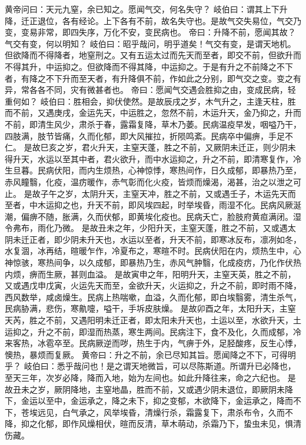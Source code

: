 \documentclass[a4paper,12pt,UTF8,twoside]{ctexbook}
\begin{document}
黄帝问曰：天元九窒，余已知之。愿闻气交，何名失守？
岐伯曰：谓其上下升降，迁正退位，各有经论。上下各有不前，故名失守也。是故气交失易位，气交乃变，变易非常，即四失序，万化不安，变民病也。
帝曰：升降不前，愿闻其故？气交有变，何以明知？
岐伯曰：昭乎哉问，明乎道矣！气交有变，是谓天地机。但欲降而不得降者，地窒刑之。又有五运太过而先天而至者，即交不前，但欲升而不得其升，中运抑之。但欲降而不得其降，中运抑之。于是有升之不前降之不下者，有降之不下升而至天者，有升降俱不前，作如此之分别，即气交之变。变之有异，常各各不同，灾有微甚者也。
帝曰：愿闻气交遇会胜抑之由，变成民病，轻重何如？
岐伯曰：胜相会，抑伏使然。是故辰戌之岁，木气升之，主逢天柱，胜而不前，又遇庚戌，金运先天，中运胜之，忽然不前，木运升天，金乃抑之，升而不前，即清生风少，肃杀于春，露霜复降，草木乃萎。民病温疫早发，咽嗌乃干，四肢满，肢节皆痛，久而化郁，即大风摧拉，折陨鸣紊。民病卒中偏痹，手足不仁。
是故巳亥之岁，君火升天，主窒天蓬，胜之不前，又厥阴未迁正，则少阴未得升天，水运以至其中者，君火欲升，而中水运抑之，升之不前，即清寒复作，冷生旦暮。民病伏阳，而内生烦热，心神惊悸，寒热间作，日久成郁，即暴热乃至，赤风瞳翳，化疫，温疠暖作，赤气彰而化火疫，皆烦而燥渴，渴甚，治之以泄之可止。
是故子午之岁，太阴升天，主窒天冲，胜之不前，又或遇壬子，木运先天而至者，中木运抑之也，升天不前，即风埃四起，时举埃昏，雨湿不化。民病风厥涎潮，偏痹不随，胀满，久而伏郁，即黄埃化疫也。民病夭亡，脸肢府黄疸满闭。湿令弗布，雨化乃微。
是故丑未之年，少阳升天，主窒天蓬，胜之不前，又或遇太阴未迁正者，即少阴未升天也，水运以至者，升天不前，即寒冰反布，凛冽如冬，水复涸，冰再结，暄暖乍作，冷夏布之，寒暄不时。民病伏阳在内，烦热生中，心神惊骇，寒热间争，以久成郁，即暴热乃生，赤风气肿翳，化成疫疠，乃化作伏热内烦，痹而生厥，甚则血溢。
是故寅申之年，阳明升天，主窒天英，胜之不前，又或遇戊申戊寅，火运先天而至，金欲升天，火运抑之，升之不前，即时雨不降，西风数举，咸卤燥生。民病上热喘嗽，血溢，久而化郁，即白埃翳雾，清生杀气，民病胁满，悲伤，寒鼽嚏，嗌干，手坼皮肤燥。
是故卯酉之年，太阳升天，主窒天芮，胜之不前，又遇阳明未迁正者，即太阳未升天也，土运以至，水欲升天，土运抑之，升之不前，即湿而热蒸，寒生两间。民病注下，食不及化，久而成郁，冷来客热，冰雹卒至。民病厥逆而哕，热生于内，气痹于外，足胫酸疼，反生心悸，懊热，暴烦而复厥。
黄帝曰：升之不前，余已尽知其旨。愿闻降之不下，可得明乎？
岐伯曰：悉乎哉问也！是之谓天地微旨，可以尽陈斯道。所谓升已必降也，至天三年，次岁必降，降而入地，始为左间也。如此升降往来，命之六纪也。
是故丑未之岁，厥阴降地，主窒地晶，胜而不前，又或遇少阴未退位，即厥阴未降下，金运以至中，金运承之，降之未下，抑之变郁，木欲降下，金运承之，降而不下，苍埃远见，白气承之，风举埃昏，清燥行杀，霜露复下，肃杀布令，久而不降，抑之化郁，即作风燥相伏，暄而反清，草木萌动，杀霜乃下，蛰虫未见，惧清伤藏。
\end{document}
